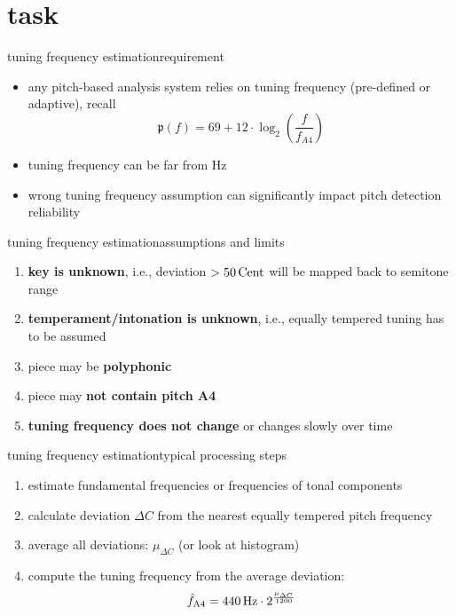     \section{task}
       \begin{frame}{tuning frequency estimation}{requirement}
    
            \begin{itemize}
                \item   any pitch-based analysis system relies on tuning frequency (pre-defined or adaptive), recall \[ \mathfrak{p}(f)= 69 + 12\cdot\log_2\left(\frac{f}{f_{A4}}\right)\]
                \item   tuning frequency can be far from \unit[440]{Hz}
                \bigskip
                \item<2->[$\Rightarrow$]   wrong tuning frequency assumption can significantly impact pitch detection reliability
            \end{itemize}
       \end{frame}
       \begin{frame}{tuning frequency estimation}{assumptions and limits}
            \begin{enumerate}
                \item   \textbf{key is unknown}, i.e., deviation $>\unit[50]{Cent}$ will be mapped back to semitone range
                \item   \textbf{temperament/intonation is unknown}, i.e., equally tempered tuning has to be assumed
                \item   piece may be \textbf{polyphonic}
                \item   piece may \textbf{not contain pitch A4}
                \item   \textbf{tuning frequency does not change} or changes slowly over time
            \end{enumerate}
       \end{frame}
       \begin{frame}{tuning frequency estimation}{typical processing steps}
            \begin{enumerate}
                \item   estimate fundamental frequencies or frequencies of tonal components
                \item   calculate deviation $\Delta C$ from the nearest equally tempered pitch frequency
                \item   average all deviations: $\mu_{\Delta C}$ (or look at histogram)
                \item   compute the tuning frequency from the average deviation:
                \[ \hat{f}_\mathrm{A4} = \unit[440]{Hz}\cdot 2^\frac{\mu_{\Delta C}}{1200}\]
                    
            \end{enumerate}
       \end{frame}
